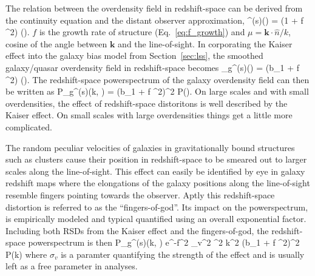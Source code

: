 The relation between the overdensity field in redshift-space can be 
derived from the continuity equation and the distant observer approximation, 
\beq
\delta^{(s)}() = (1 + f \mu^2) \delta().
\eeq
$f$ is the growth rate of structure (Eq.~\ref{eq:f_growth}) and 
$\mu = \bm{k} \cdot \hat{n} / k$, cosine of the angle between $\bm{k}$ and 
the line-of-sight. In corporating the Kaiser effect into the galaxy bias model 
from Section~\ref{sec:lss}, the smoothed galaxy/quasar overdensity field in 
redshift-space becomes
\beq
\delta_g^{(s)}() = (b_1 + f \mu^2) \delta().
\eeq
The redshift-space powerspectrum of the galaxy overdensity field can then be
written as 
\beq
P_g^{(s)}(k, \mu) = (b_1 + f \mu^2)^2 P().
\eeq
On large scales and with small overdensities, the effect of redshift-space 
distoritons is well described by the Kaiser effect. On small scales with large
overdensities things get a little more complicated. 

The random peculiar velocities of galaxies in gravitationally bound structures 
such as clusters cause their position in redshift-space to be smeared out to 
larger scales along the line-of-sight. This effect can easily be identified by 
eye in galaxy redshift maps where the elongations of the galaxy positions along the 
line-of-sight resemble fingers pointing towards the observer. Aptly this 
redshift-space distortion is referred to as the ``fingers-of-god''. Its impact on the 
powerspectrum, is empirically modeled and typical quantified using an overall exponential 
factor. Including both RSDs from the Kaiser effect and the fingers-of-god, the 
redshift-space powerspectrum is then 
\beq \label{eq:pk_rsd}
P_g^{(s)}(k, \mu) \approx e^{-f^2 \sigma_v^2 \mu^2 k^2} (b_1 + f \mu^2)^2 P(k)
\eeq
where $\sigma_v$ is a paramter quantifying the strength of the effect and is usually
left as a free parameter in analyses. 

